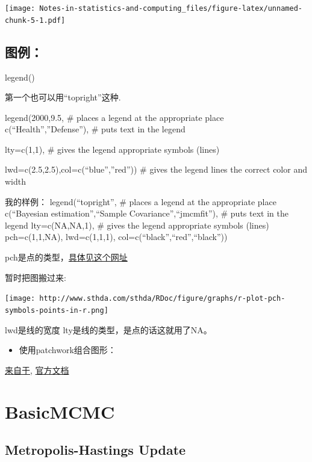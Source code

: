 \documentclass[
]{book}
\providecommand{\tightlist}{%
  \setlength{\itemsep}{0pt}\setlength{\parskip}{0pt}}
\theoremstyle{definition}
\theoremstyle{definition}
\theoremstyle{definition}
\theoremstyle{remark}
\begin{document}
\texttt{[image: Notes-in-statistics-and-computing\_files/figure-latex/unnamed-chunk-5-1.pdf]}

\hypertarget{ux56feux4f8b}{%
\section{图例：}\label{ux56feux4f8b}}

legend()

第一个也可以用``topright''这种.

legend(2000,9.5, \# places a legend at the appropriate place c(``Health'',''Defense''), \# puts text in the legend

lty=c(1,1), \# gives the legend appropriate symbols (lines)

lwd=c(2.5,2.5),col=c(``blue'',''red'')) \# gives the legend lines the correct color and width

我的样例：
legend(``topright'', \# places a legend at the appropriate place
c(``Bayesian estimation'',``Sample Covariance'',``jmcmfit''), \# puts text in the legend
lty=c(NA,NA,1), \# gives the legend appropriate symbols (lines)
pch=c(1,1,NA),
lwd=c(1,1,1),
col=c(``black'',``red'',``black''))

pch是点的类型，\href{http://www.sthda.com/english/wiki/r-plot-pch-symbols-the-different-point-shapes-available-in-r}{具体见这个网址}

暂时把图搬过来:

\texttt{[image: http://www.sthda.com/sthda/RDoc/figure/graphs/r-plot-pch-symbols-points-in-r.png]}

lwd是线的宽度
lty是线的类型，是点的话这就用了NA。

\begin{itemize}
\tightlist
\item
  使用patchwork组合图形：
\end{itemize}

\href{https://d.cosx.org/d/421267-ggplot-patchwork}{来自于}, \href{https://github.com/thomasp85/patchwork}{官方文档}

\hypertarget{basicmcmc}{%
\chapter{BasicMCMC}\label{basicmcmc}}

\hypertarget{metropolis-hastings-update}{%
\section{Metropolis-Hastings Update}\label{metropolis-hastings-update}}
\end{document}
